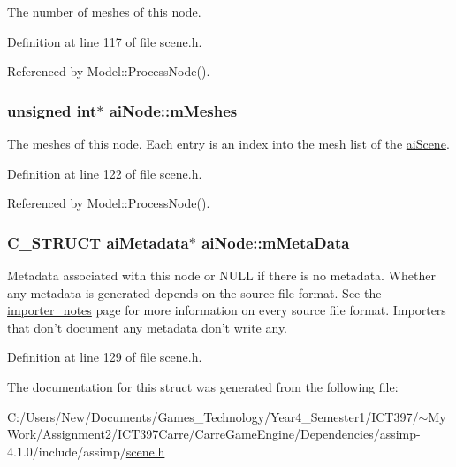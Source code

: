 The number of meshes of this node. 

Definition at line 117 of file scene.h.

Referenced by Model::ProcessNode().\hypertarget{structai_node_cd1706d6508b31916c18e39b7085ca63}{
\subsubsection[mMeshes]{\setlength{\rightskip}{0pt plus 5cm}unsigned int$\ast$ {\bf aiNode::mMeshes}}}
\label{structai_node_cd1706d6508b31916c18e39b7085ca63}


The meshes of this node. Each entry is an index into the mesh list of the \hyperlink{structai_scene}{aiScene}. 

Definition at line 122 of file scene.h.

Referenced by Model::ProcessNode().\hypertarget{structai_node_111b5a6cbc5dccde0cf2a17a6e5c3b67}{
\subsubsection[mMetaData]{\setlength{\rightskip}{0pt plus 5cm}C\_\-STRUCT {\bf aiMetadata}$\ast$ {\bf aiNode::mMetaData}}}
\label{structai_node_111b5a6cbc5dccde0cf2a17a6e5c3b67}


Metadata associated with this node or NULL if there is no metadata. Whether any metadata is generated depends on the source file format. See the \hyperlink{}{importer\_\-notes} page for more information on every source file format. Importers that don't document any metadata don't write any. 

Definition at line 129 of file scene.h.

The documentation for this struct was generated from the following file:\begin{CompactItemize}
\item 
C:/Users/New/Documents/Games\_\-Technology/Year4\_\-Semester1/ICT397/$\sim$My Work/Assignment2/ICT397Carre/CarreGameEngine/Dependencies/assimp-4.1.0/include/assimp/\hyperlink{scene_8h}{scene.h}\end{CompactItemize}
